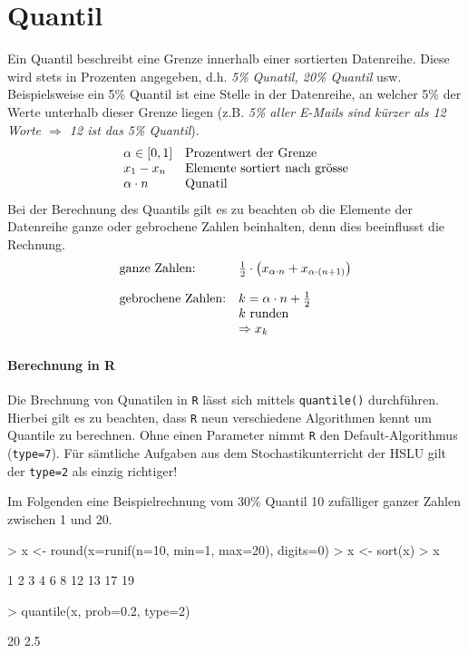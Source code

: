 \section{Quantil}
Ein \gls{Quantil} beschreibt eine Grenze innerhalb einer sortierten 
Datenreihe. Diese wird stets in Prozenten angegeben, d.h. 
\emph{5\% Qunatil, 20\% Quantil} usw. 
Beispielsweise ein 5\% Quantil ist eine Stelle in der Datenreihe, an 
welcher 5\% der Werte unterhalb dieser Grenze liegen (z.B. \emph{5\% 
aller E-Mails sind kürzer als 12 Worte $\Rightarrow$ 12 ist das 5\%
Quantil}).
\[ \begin{array}{l l}
	\alpha \in [0, 1] 
		& \text{Prozentwert der Grenze} \\
	x_1 - x_n
		& \text{Elemente sortiert nach grösse} \\
	\alpha \cdot n 
		& \text{Qunatil} \\
\end{array} \]
Bei der Berechnung des Quantils gilt es zu beachten ob die Elemente 
der Datenreihe ganze oder gebrochene Zahlen beinhalten, denn dies 
beeinflusst die Rechnung.
\[ \begin{array}{l l}
	\text{ganze Zahlen:}
		& \frac{1}{2} \cdot \left(
			x_{\alpha \cdot n} 
			+ x_{\alpha \cdot (n + 1)} \right)  \\
	& \\
	\text{gebrochene Zahlen:}
		& k = \alpha \cdot n + \frac{1}{2}  \\
		& k \text{ runden} \\
		& \Rightarrow x_{k}
\end{array} \]

\paragraph{Berechnung in R}
Die Brechnung von Qunatilen in \lstinline{R} lässt sich mittels 
\lstinline{quantile()} durchführen. Hierbei gilt es zu beachten, dass
\lstinline{R} neun verschiedene Algorithmen kennt um Quantile zu 
berechnen. Ohne einen Parameter nimmt \lstinline{R} den 
Default-Algorithmus (\lstinline{type=7}). Für sämtliche Aufgaben aus dem
Stochastikunterricht der HSLU gilt der \lstinline{type=2} als einzig
richtiger! 

Im Folgenden eine Beispielrechnung vom 30\% \gls{Quantil} 10 zufälliger 
ganzer Zahlen zwischen 1 und 20.
\begin{Schunk}
\begin{Sinput}
> x <- round(x=runif(n=10, min=1, max=20), digits=0)
> x <- sort(x)
> x
\end{Sinput}
\begin{Soutput}
 [1]  1  2  3  4  6  8 12 13 17 19
\end{Soutput}
\begin{Sinput}
> quantile(x, prob=0.2, type=2)
\end{Sinput}
\begin{Soutput}
20%
2.5 
\end{Soutput}
\end{Schunk}

